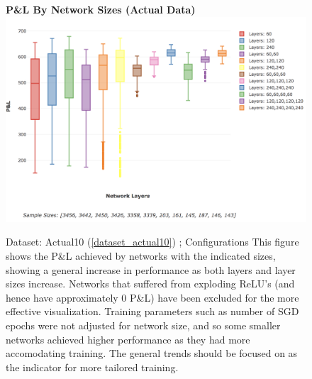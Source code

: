 \documentclass[a4paper,11pt,oneside]{article}
\theoremstyle{plain}
\theoremstyle{definition}
\begin{document}
\begin{figure}[H]
	\centering 
	\textbf{P\&L By Network Sizes (Actual Data)}
	\includegraphics[scale=0.3]{images/results/network/actual_pl_box.png} 
	\caption{Dataset: Actual10 (\ref{dataset_actual10}) ; Configurations 
		\newline This figure shows the P\&L achieved by networks with the indicated sizes, showing a general increase in performance as both layers and layer sizes increase. Networks that suffered from exploding ReLU's (and hence have approximately 0 P\&L) have been excluded for the more effective visualization. Training parameters such as number of SGD epochs were not adjusted for network size, and so some smaller networks achieved higher performance as they had more accomodating training. The general trends should be focused on as the indicator for more tailored training.}
	\label{figure-results_actual_pl_box}
\end{figure}
\end{document}
